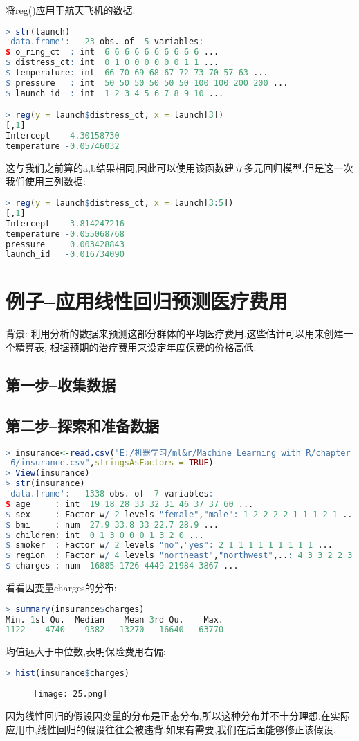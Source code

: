 \documentclass[11pt,a4paper,oneside]{book}
\begin{document}
将reg()应用于航天飞机的数据:
\begin{lstlisting}[language=r]
> str(launch)
'data.frame':	23 obs. of  5 variables:
$ o_ring_ct  : int  6 6 6 6 6 6 6 6 6 6 ...
$ distress_ct: int  0 1 0 0 0 0 0 0 1 1 ...
$ temperature: int  66 70 69 68 67 72 73 70 57 63 ...
$ pressure   : int  50 50 50 50 50 50 100 100 200 200 ...
$ launch_id  : int  1 2 3 4 5 6 7 8 9 10 ...

> reg(y = launch$distress_ct, x = launch[3])
[,1]
Intercept    4.30158730
temperature -0.05746032
\end{lstlisting}
这与我们之前算的a,b结果相同,因此可以使用该函数建立多元回归模型.但是这一次我们使用三列数据:
\begin{lstlisting}[language=r]
> reg(y = launch$distress_ct, x = launch[3:5])
[,1]
Intercept    3.814247216
temperature -0.055068768
pressure     0.003428843
launch_id   -0.016734090
\end{lstlisting}

\section{例子--应用线性回归预测医疗费用}
背景: 利用分析的数据来预测这部分群体的平均医疗费用.这些估计可以用来创建一个精算表,
根据预期的治疗费用来设定年度保费的价格高低.

\subsection{第一步--收集数据}
\subsection{第二步--探索和准备数据}
\begin{lstlisting}[language=r]
> insurance<-read.csv("E:/机器学习/ml&r/Machine Learning with R/chapter
 6/insurance.csv",stringsAsFactors = TRUE)
> View(insurance)
> str(insurance)
'data.frame':	1338 obs. of  7 variables:
$ age     : int  19 18 28 33 32 31 46 37 37 60 ...
$ sex     : Factor w/ 2 levels "female","male": 1 2 2 2 2 1 1 1 2 1 ...
$ bmi     : num  27.9 33.8 33 22.7 28.9 ...
$ children: int  0 1 3 0 0 0 1 3 2 0 ...
$ smoker  : Factor w/ 2 levels "no","yes": 2 1 1 1 1 1 1 1 1 1 ...
$ region  : Factor w/ 4 levels "northeast","northwest",..: 4 3 3 2 2 3 3...
$ charges : num  16885 1726 4449 21984 3867 ...
\end{lstlisting}
看看因变量charges的分布:
\begin{lstlisting}[language=r]
> summary(insurance$charges)
Min. 1st Qu.  Median    Mean 3rd Qu.    Max. 
1122    4740    9382   13270   16640   63770 
\end{lstlisting}
均值远大于中位数,表明保险费用右偏:
\begin{lstlisting}[language=r]
> hist(insurance$charges)
\end{lstlisting}
\begin{figure}[H]
	\centering
	\texttt{[image: 25.png]}
\end{figure}
因为线性回归的假设因变量的分布是正态分布,所以这种分布并不十分理想.在实际应用中,线性回归的假设往往会被违背.如果有需要,我们在后面能够修正该假设.
\end{document}
